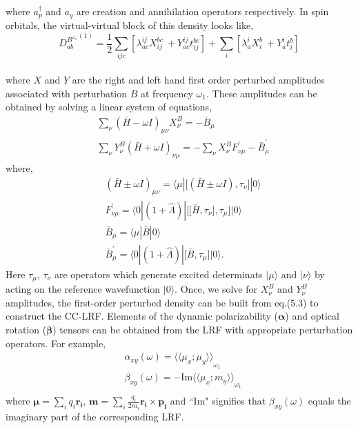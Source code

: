 \\
where $a^{\dagger}_{p}$ and $a_q$ are creation and annihilation operators respectively. 
In spin orbitals, the virtual-virtual block of this density looks like,
\\
\begin{equation}
{D^{B^{\omega_1}}_{ab}}^{(1)}= \frac{1}{2}\sum_{ijc}[\lambda^{ij}_{ac}X^{bc}_{ij} \
+ Y^{ij}_{ac}t^{bc}_{ij}] + \sum_i[\lambda^{i}_{a}X^{b}_{i}\
+ Y^{i}_{a}t^{b}_{i}] 
\end{equation}
\\
where $X$ and $Y$ are the right and left hand first order perturbed amplitudes associated with 
perturbation $B$ at frequency $\omega_1$. These amplitudes can be obtained 
by solving a linear system of equations,  
\\
\begin{equation}
\begin{split}
& \sum_\nu{(\bar{H} - \omega I)}_{\mu\nu}X_{\nu}^{B} = -\bar{B}_{\mu} \\
&\sum_\nu Y_{\nu}^{B}{(\bar{H} + \omega I)}_{\nu\mu}
= -  \sum_\nu X_{\nu}^{B} F^{'}_{\nu\mu} - \bar{B}^{'}_{\mu}
\end{split}
\end{equation}
where,
\begin{equation}
\begin{split}
&{(\bar{H} \pm \omega I)}_{\mu\nu} = \langle \mu | \big[(\bar{H} \pm \omega I),\tau_\nu\big] |0\rangle\\
&F^{'}_{\nu\mu} = \langle 0|(1 + \hat{\Lambda})|\big[\big[\bar{H},\tau_\nu\big],\tau_\mu\big] |0 \rangle\\ 
&\bar{B}_{\mu} = \langle \mu|\bar{B}|0 \rangle \\
& \bar{B}^{'}_{\mu} = \langle 0|(1 + \hat{\Lambda})|\big[\bar{B},\tau_\mu\big] |0 \rangle.
\end{split}
\end{equation}
Here $\tau_\mu$, $\tau_\nu$ are operators which generate excited determinats $|\mu\rangle$
and $|\nu\rangle$ by acting on the reference wavefunction $|0\rangle$. Once, we solve for 
$X_{\nu}^{B}$ and $Y_{\nu}^{B}$ amplitudes, the first-order perturbed density can be built 
from eq.(5.3) to construct the CC-LRF. Elements of the dynamic polarizability ($\bm{\alpha}$) 
and optical rotation ($\bm{\beta}$) tensors can be obtained from the LRF with appropriate 
perturbation operators. For example,
\begin{equation}
\begin{split}
& \alpha_{xy}(\omega) = {\langle\langle \mu_x;\mu_y\rangle\rangle}_{\omega_1}\\
&\beta_{xy}(\omega) = {-\text{Im} \langle\langle \mu_x;m_y\rangle\rangle}_{\omega_1} \\
\end{split}
\end{equation}
where $\bm{\mu} = \sum_i q_i \bm{r_i} $, $\bm{m} = \sum_i \frac{q_i}{2m_i} \bm{r_i} \times \bm{p_i}$
and ``Im" signifies that $\beta_{xy}(\omega)$ equals the imaginary part of the corresponding LRF.
